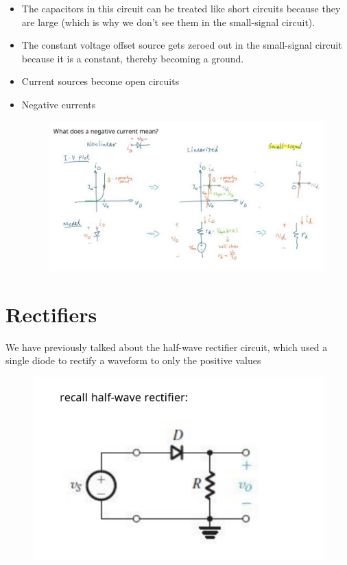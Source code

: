 \documentclass[../notes.tex]{subfiles}
\begin{document}
\begin{itemize}
	\item The capacitors in this circuit can be treated like short circuits because they are large (which is why we don't see them in the small-signal circuit).
	\item The constant voltage offset source gets zeroed out in the small-signal circuit because it is a constant, thereby becoming a ground.
	\item Current sources become open circuits
	\item Negative currents 
\begin{figure}[H]
	\centering
	\includegraphics[width=0.8\linewidth]{img/image_2022-09-23-12-33-13.png}
\end{figure}

\end{itemize}




\section{Rectifiers}

We have previously talked about the half-wave rectifier circuit, which used a single diode to rectify a waveform to only the positive values

\begin{figure}[H]
	\centering
	\includegraphics[width=0.8\linewidth]{img/image_2022-09-23-12-41-12.png}
\end{figure}
\end{document}

